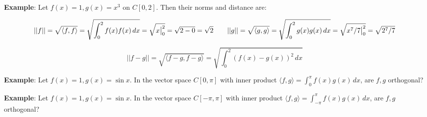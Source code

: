 \textbf{Example}: Let $f(x) = 1, g(x) = x^3$ on $C[0, 2]$. Then their norms and distance are:

$$
|| f || = \sqrt{ \langle f, f \rangle } = \sqrt{ \int_0^2 f(x) f(x) \, dx } = \sqrt{ x \big{|}_0^2 } = \sqrt{2 - 0} = \sqrt{2}
\qquad
|| g || = \sqrt{ \langle g, g \rangle } = \sqrt{ \int_0^2 g(x) g(x) \, dx } = \sqrt{ x^7 / 7 \big{|}_0^2 } = \sqrt{2^7 / 7}
$$

$$
|| f - g || = \sqrt{ \langle f - g, f - g \rangle } = \sqrt{ \int_0^2 (f(x) - g(x))^2 \, dx }
$$

\textbf{Example}: Let $f(x) = 1, g(x) = \sin{x}$. In the vector space $C[0, \pi]$ with inner product $\langle f, g \rangle = \int_0^\pi f(x) g(x) \, dx$, are $f, g$ orthogonal?

\textbf{Example}: Let $f(x) = 1, g(x) = \sin{x}$. In the vector space $C[-\pi, \pi]$ with inner product $\langle f, g \rangle = \int_{-\pi}^\pi f(x) g(x) \, dx$, are $f, g$ orthogonal?


